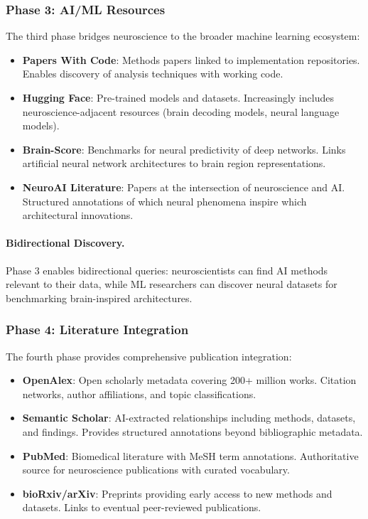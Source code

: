 \documentclass{article}
\theoremstyle{definition}
\begin{document}
\subsubsection{Phase 3: AI/ML Resources}

The third phase bridges neuroscience to the broader machine learning ecosystem:

\begin{itemize}
    \item \textbf{Papers With Code}: Methods papers linked to implementation repositories. Enables discovery of analysis techniques with working code.

    \item \textbf{Hugging Face}: Pre-trained models and datasets. Increasingly includes neuroscience-adjacent resources (brain decoding models, neural language models).

    \item \textbf{Brain-Score}: Benchmarks for neural predictivity of deep networks. Links artificial neural network architectures to brain region representations.

    \item \textbf{NeuroAI Literature}: Papers at the intersection of neuroscience and AI. Structured annotations of which neural phenomena inspire which architectural innovations.
\end{itemize}

\paragraph{Bidirectional Discovery.} Phase 3 enables bidirectional queries: neuroscientists can find AI methods relevant to their data, while ML researchers can discover neural datasets for benchmarking brain-inspired architectures.

\subsubsection{Phase 4: Literature Integration}

The fourth phase provides comprehensive publication integration:

\begin{itemize}
    \item \textbf{OpenAlex}: Open scholarly metadata covering 200+ million works. Citation networks, author affiliations, and topic classifications.

    \item \textbf{Semantic Scholar}: AI-extracted relationships including methods, datasets, and findings. Provides structured annotations beyond bibliographic metadata.

    \item \textbf{PubMed}: Biomedical literature with MeSH term annotations. Authoritative source for neuroscience publications with curated vocabulary.

    \item \textbf{bioRxiv/arXiv}: Preprints providing early access to new methods and datasets. Links to eventual peer-reviewed publications.
\end{itemize}
\end{document}
